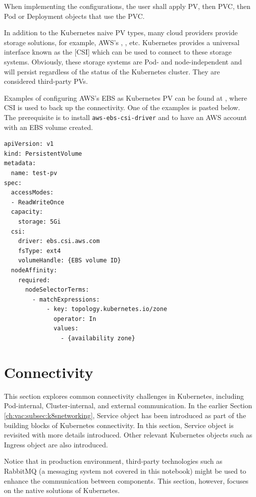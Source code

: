 When implementing the configurations, the user shall apply PV, then PVC, then Pod or Deployment objects that use the PVC.

In addition to the Kubernetes naive PV types, many cloud providers provide storage solutions, for example, AWS's , , etc. Kubernetes provides a universal interface known as the [CSI] which can be used to connect to these storage systems. Obviously, these storage systems are Pod- and node-independent and will persist regardless of the status of the Kubernetes cluster. They are considered third-party PVs.

Examples of configuring AWS's EBS as Kubernetes PV can be found at \cite{aws2024csiebsexamples}, where CSI is used to back up the connectivity. One of the examples is pasted below. The prerequisite is to install \texttt{aws-ebs-csi-driver} and to have an AWS account with an EBS volume created.
\begin{lstlisting}
apiVersion: v1
kind: PersistentVolume
metadata:
  name: test-pv
spec:
  accessModes:
  - ReadWriteOnce
  capacity:
    storage: 5Gi
  csi:
    driver: ebs.csi.aws.com
    fsType: ext4
    volumeHandle: {EBS volume ID}
  nodeAffinity:
    required:
      nodeSelectorTerms:
        - matchExpressions:
            - key: topology.kubernetes.io/zone
              operator: In
              values:
                - {availability zone}
\end{lstlisting}

\section{Connectivity}

This section explores common connectivity challenges in Kubernetes, including Pod-internal, Cluster-internal, and external communication. In the earlier Section \ref{ch:vac:subsec:k8snetworking}, Service object has been introduced as part of the building blocks of Kubernetes connectivity. In this section, Service object is revisited with more details introduced. Other relevant Kubernetes objects such as Ingress object are also introduced.

Notice that in production environment, third-party technologies such as RabbitMQ (a messaging system not covered in this notebook) might be used to enhance the communication between components. This section, however, focuses on the native solutions of Kubernetes.

